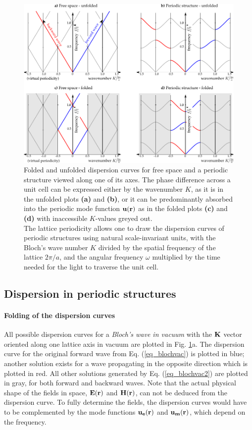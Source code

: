 \begin{figure}[ht] \caption{Folded and unfolded dispersion curves for free space and a periodic structure viewed along one of its axes. The phase difference across a unit cell can be expressed either by the wavenumber $K$, as it is in the unfolded plots \textbf{(a)} and \textbf{(b)}, or it can be predominantly absorbed into the periodic mode function $\mathbf{u}({\mathbf{r}})$  as in the folded plots \textbf{(c)} and \textbf{(d)} with inaccessible $K$-values greyed out. \\
The lattice periodicity allows one to draw the dispersion curves of periodic structures using natural scale-invariant units, with the Bloch's wave number $K$ divided by the spatial frequency of the lattice $2\pi/a$, and the angular frequency $\omega$ multiplied by the time needed for the light to traverse the unit cell.
} \label{fg_phcfolding} \centering 
	\includegraphics[width=\textwidth]{img/PhC_folding_illustration.pdf} 
\end{figure}
\clearpage


\subsection{Dispersion in periodic structures}
\paragraph{Folding of the dispersion curves} %
All possible dispersion curves for a \textit{Bloch's wave in vacuum} with the ${\mathbf{K}}$ vector oriented along one lattice axis in vacuum are plotted in Fig. \ref{fg_phcfolding}a. The dispersion curve for the original forward wave from Eq. (\ref{eq_blochvac}) is plotted in blue; another solution exists for a wave propagating in the opposite direction which is plotted in red. All other solutions generated by Eq. (\ref{eq_blochvac2}) are plotted in gray, for both forward and backward waves. 
Note that the actual physical shape of the fields in space,  $\mathbf{E}({\mathbf{r}})$ and $\mathbf{H}({\mathbf{r}})$, can not be deduced from the dispersion curve. To fully determine the fields, the dispersion curves would have to be complemented by the mode functions $\mathbf{u_e}({\mathbf{r}})$ and $\mathbf{u_m}({\mathbf{r}})$, which depend on the frequency. 


